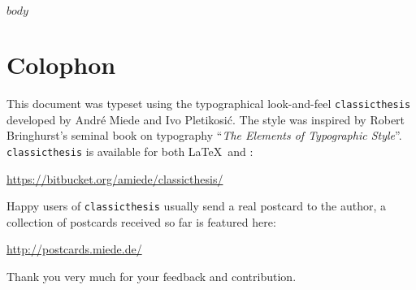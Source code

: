 

$body$

%
\printbibliography[
heading=bibintoc
]

\label{app:bibliography} %
%
\manualmark
\markboth{\spacedlowsmallcaps{\bibname}}{\spacedlowsmallcaps{\bibname}}
%

%
% 
%
% 
%


\pagestyle{empty}

\hfill

\vfill


\section*{Colophon}
This document was typeset using the typographical look-and-feel \texttt{classicthesis} developed by Andr\'e Miede and Ivo Pletikosić.
The style was inspired by Robert Bringhurst's seminal book on typography ``\emph{The Elements of Typographic Style}''.
\texttt{classicthesis} is available for both \LaTeX\ and \mLyX:
\begin{center}
\url{https://bitbucket.org/amiede/classicthesis/}
\end{center}
Happy users of \texttt{classicthesis} usually send a real postcard to the author, a collection of postcards received so far is featured here:
\begin{center}
\url{http://postcards.miede.de/}
\end{center}
Thank you very much for your feedback and contribution.

\bigskip

\noindent\finalVersionString


